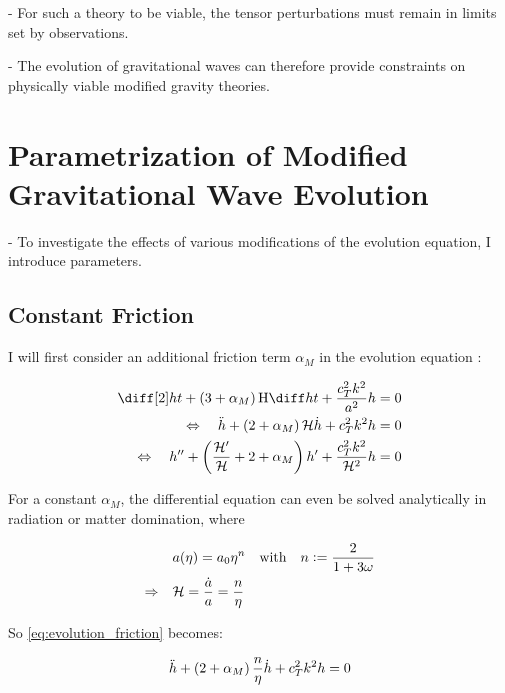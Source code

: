\documentclass[parskip=half]{scrreprt}
\begin{document}
- For such a theory to be viable, the tensor perturbations must remain in limits set by observations.

- The evolution of gravitational waves can therefore provide constraints on physically viable modified gravity theories.


\chapter{Parametrization of Modified Gravitational Wave Evolution}

- To investigate the effects of various modifications of the evolution equation, I introduce parameters.


\section{Constant Friction}

I will first consider an additional friction term $\alpha_M$ in the evolution equation \citep{Pettorino2014}:

\begin{align}\label{eq:evolution_friction}
	\ddt{h} + \left( 3 + \alpha_M \right) \Hcosm \dt{h} + \frac{c_T^2 k^2}{a^2} h &= 0 \\
	\Leftrightarrow \quad \ddconf{h} + \left( 2 + \alpha_M \right) \Hconf \dconf{h} + c_T^2 k^2 h &= 0 \\
    \Leftrightarrow \quad \ddefold{h} + \left( \frac{\defold{\Hconf}}{\Hconf} + 2 + \alpha_M \right) \defold{h} + \frac{c_T^2 k^2}{\Hconf^2} h &= 0
\end{align}


For a constant $\alpha_M$, the differential equation can even be solved analytically in radiation or matter domination, where

\begin{align}
	&a(\eta) = a_0 \eta^n \quad \textrm{with} \quad n := \frac{2}{1+3\omega} \\
	\Rightarrow \quad &\mathcal{H} = \frac{\dot{a}}{a} = \frac{n}{\eta}
\end{align}

So \ref{eq:evolution_friction} becomes:

\begin{equation}\label{eq:evolution_friction_matter}
	\ddot{h} + \left( 2 + \alpha_M \right) \frac{n}{\eta} \dot{h} + c_T^2 k^2 h = 0
\end{equation}
\end{document}
